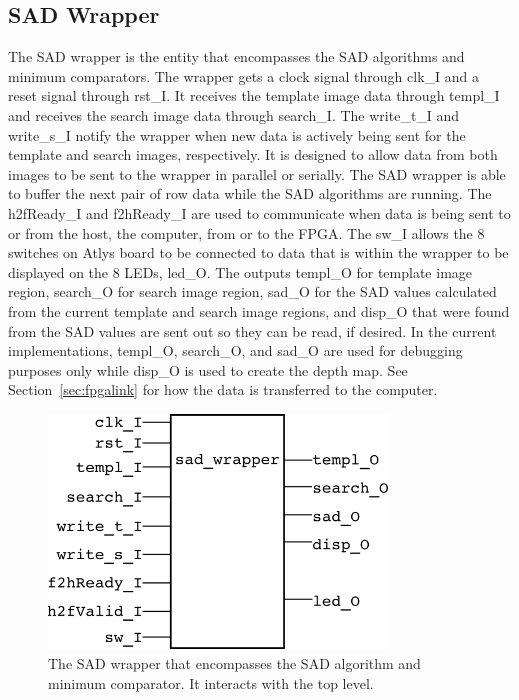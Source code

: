\subsection{SAD Wrapper}

The SAD wrapper is the entity that encompasses the SAD algorithms and minimum comparators. The wrapper gets a clock signal through clk\_I and a reset signal through rst\_I. It receives the template image data through templ\_I and receives the search image data through search\_I. The write\_t\_I and write\_s\_I notify the wrapper when new data is actively being sent for the template and search images, respectively. It is designed to allow data from both images to be sent to the wrapper in parallel or serially. The SAD wrapper is able to buffer the next pair of row data while the SAD algorithms are running. The h2fReady\_I and f2hReady\_I are used to communicate when data is being sent to or from the host, the computer, from or to the FPGA. The sw\_I allows the 8 switches on Atlys board to be connected to data that is within the wrapper to be displayed on the 8 LEDs, led\_O. The outputs templ\_O for template image region, search\_O for search image region, sad\_O for the SAD values calculated from the current template and search image regions, and disp\_O that were found from the SAD values are sent out so they can be read, if desired. In the current implementations, templ\_O, search\_O, and sad\_O are used for debugging purposes only while disp\_O is used to create the depth map. See Section~\ref{sec:fpgalink} for how the data is transferred to the computer.

\begin{figure}[h]
	\begin{center}
		\includegraphics[width=90mm]{figures/sad_wrapper_rtl.png}
		\captionfonts
		\caption{The SAD wrapper that encompasses the SAD algorithm and minimum comparator. It interacts with the top level.}
		\label{fig:sadWrapper_rtl}
	\end{center}
\end{figure}

